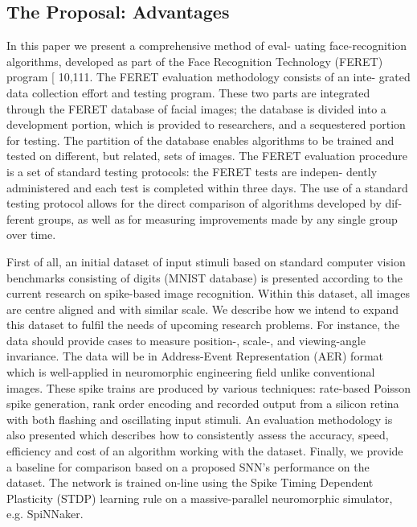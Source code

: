 \subsection{The Proposal: Advantages}
In this paper we present a comprehensive method of eval-
uating face-recognition
algorithms, developed as part of the
Face Recognition Technology (FERET) program [ 10,111.
The FERET evaluation methodology consists of an inte-
grated data collection effort and testing program. These
two parts are integrated through the FERET database of
facial images; the database is divided into a development
portion, which is provided to researchers, and a sequestered
portion for testing. The partition of the database enables
algorithms to be trained and tested on different, but related,
sets of images. The FERET evaluation procedure is a set of
standard testing protocols: the FERET tests are indepen-
dently administered
and each test is completed within
three days. The use of a standard testing protocol allows
for the direct comparison of algorithms developed by dif-
ferent groups, as well as for measuring improvements made
by any single group over time.

First of all, an initial dataset of input stimuli based on standard computer vision benchmarks consisting of %
digits (MNIST database) is presented according to the current research on spike-based image recognition.
Within this dataset, all images are centre aligned and with similar scale.
We describe how we intend to expand this dataset to fulfil the needs of upcoming research problems.
For instance, the data should provide cases to measure position-, scale-, and viewing-angle invariance.
The data will be in Address-Event Representation (AER) format which is well-applied in neuromorphic engineering field unlike conventional images.
These spike trains are produced by various techniques: rate-based Poisson spike generation, rank order encoding and recorded output from a silicon retina with both flashing and oscillating input stimuli.
An evaluation methodology is also presented which describes how to consistently assess the accuracy, speed, efficiency and cost of an algorithm working with the dataset.
Finally, we provide a baseline for comparison based on a proposed SNN's performance on the dataset.
The network is trained on-line using the Spike Timing Dependent Plasticity (STDP) learning rule on a massive-parallel neuromorphic simulator, e.g. SpiNNaker.